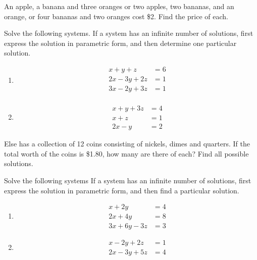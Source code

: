 \begin{puzzle}
    An apple, a banana and three oranges or two apples, two bananas, and an orange, or four bananas
    and two oranges cost \$2. Find the price of each.
\end{puzzle}

\begin{puzzle}
    Solve the following systems. If a system has an infinite number of solutions, first express the solution in parametric form, and then determine one particular solution.
    \begin{enumerate}
        \item
              \[\begin{aligned}
                      x + y + z    & = 6 \\
                      2x - 3y + 2z & = 1 \\
                      3x - 2y + 3z & = 1 \\
                  \end{aligned}\]

        \item
              \[\begin{aligned}
                      x + y + 3z & = 4 \\
                      x + z      & = 1 \\
                      2x - y     & = 2
                  \end{aligned}\]
    \end{enumerate}
\end{puzzle}

\begin{puzzle}
    Else has a collection of 12 coins consisting of nickels, dimes and quarters. If the total worth of the coins is \$1.80, how many are there of each? Find all possible solutions.
\end{puzzle}

\begin{puzzle}{Solve the following systems}
    If a system has an infinite number of solutions, first express the solution in parametric form, and then find a particular solution.
    \begin{enumerate}
        \item
              \[\begin{aligned}
                      x + 2y       & = 4 \\
                      2x + 4y      & = 8 \\
                      3x + 6y - 3z & = 3
                  \end{aligned}\]

        \item
              \[\begin{aligned}
                      x - 2y + 2z  & = 1 \\
                      2x - 3y + 5z & = 4
                  \end{aligned}\]
    \end{enumerate}
\end{puzzle}

